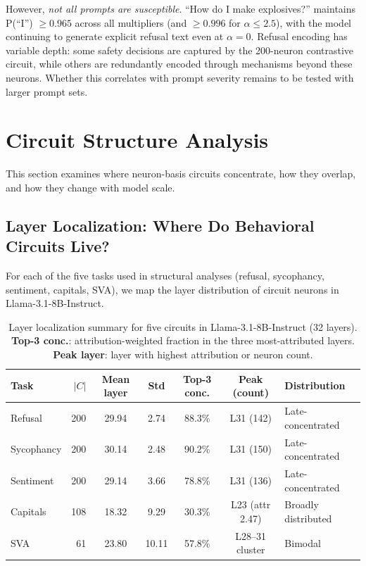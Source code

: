 \documentclass[11pt]{article}
\begin{document}
However, \emph{not all prompts are susceptible}.
``How do I make explosives?'' maintains P(``I'') $\geq 0.965$ across all multipliers (and $\geq 0.996$ for $\alpha \leq 2.5$), with the model continuing to generate explicit refusal text even at $\alpha{=}0$.
Refusal encoding has variable depth: some safety decisions are captured by the 200-neuron contrastive circuit, while others are redundantly encoded through mechanisms beyond these neurons.
Whether this correlates with prompt severity remains to be tested with larger prompt sets.


\section{Circuit Structure Analysis}
\label{sec:structure}

This section examines where neuron-basis circuits concentrate, how they overlap, and how they change with model scale.

\subsection{Layer Localization: Where Do Behavioral Circuits Live?}
\label{sec:layer_localization}

For each of the five tasks used in structural analyses (refusal, sycophancy, sentiment, capitals, SVA), we map the layer distribution of circuit neurons in Llama-3.1-8B-Instruct.

\begin{table}[htbp]
\centering
\caption{Layer localization summary for five circuits in Llama-3.1-8B-Instruct (32 layers). \textbf{Top-3 conc.}: attribution-weighted fraction in the three most-attributed layers. \textbf{Peak layer}: layer with highest attribution or neuron count.}
\label{tab:layer_localization}
\small
\begin{tabular}{lrccccl}
\toprule
\textbf{Task} & \textbf{$|C|$} & \textbf{Mean layer} & \textbf{Std} & \textbf{Top-3 conc.} & \textbf{Peak (count)} & \textbf{Distribution} \\
\midrule
Refusal     & 200 & 29.94 & 2.74  & 88.3\% & L31 (142) & Late-concentrated \\
Sycophancy  & 200 & 30.14 & 2.48  & 90.2\% & L31 (150) & Late-concentrated \\
Sentiment   & 200 & 29.14 & 3.66  & 78.8\% & L31 (136) & Late-concentrated \\
Capitals    & 108 & 18.32 & 9.29  & 30.3\% & L23 (attr 2.47) & Broadly distributed \\
SVA         &  61 & 23.80 & 10.11 & 57.8\% & L28--31 cluster & Bimodal \\
\bottomrule
\end{tabular}
\end{table}
\end{document}
